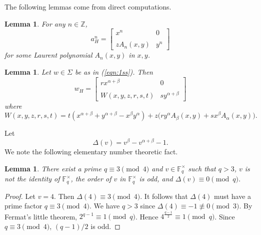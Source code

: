\documentclass[10pt,a4paper]{amsart}
\newtheorem{lemma}[theorem]{Lemma}
\theoremstyle{definition}
\theoremstyle{definition}
\numberwithin{equation}{section}
\begin{document}
The following lemmas come from direct computations.

\begin{lemma}\label{lem:anH} For any $n\in\mathbb{Z}$, 
$$ a_H^n=\left[\begin{array}{cc} x^n & 0 \\ \\ zA_n(x,y) & y^n\end{array}\right] $$
for some Laurent polynomial $A_n(x,y)$ in $x, y$.
\end{lemma}




\begin{lemma}\label{lem:wH} Let $w\in \Sigma$ be as in (\ref{eqn:1ss}). Then
$$ w_H=\left[\begin{array}{cc} rx^{\alpha+\beta} & 0 \\ \\ W(x,y,z,r,s,t) & sy^{\alpha+\beta} \end{array}\right] $$
where
$$ W(x,y,z,r,s,t)= t(x^{\alpha+\beta}+y^{\alpha+\beta}-x^\beta y^{\alpha})+z\big(ry^\alpha A_\beta(x,y)+sx^\beta A_\alpha(x,y)\big). $$
\end{lemma}

Let
\begin{equation} \Delta(v)=v^{\beta}-v^{\alpha+\beta}-1. \end{equation}
We note the following elementary number theoretic fact.

\begin{lemma}\label{lem:4q} There exist a prime $q\equiv 3\pmod 4$ and $v\in \mathbb{F}_q^\times$ such that $q>3$, $v$ is not the identity of $\mathbb{F}_q^\times$, the order of $v$ in $\mathbb{F}_q^\times$ is odd, and $\Delta(v)\equiv 0\pmod q$.
\end{lemma}

\begin{proof} Let $v=4$. Then $\Delta(4)\equiv 3\pmod 4$. It follows that  $\Delta(4)$ must have a prime factor $q\equiv 3\pmod 4$. We have $q>3$ since $\Delta(4)\equiv -1\not\equiv 0\pmod 3$. By Fermat's little theorem, $2^{q-1}\equiv 1\pmod q$. Hence $4^{\frac{q-1}{2}}\equiv 1\pmod q$. Since $q\equiv 3\pmod 4$, $(q-1)/2$ is odd. 
\end{proof}
\end{document}
